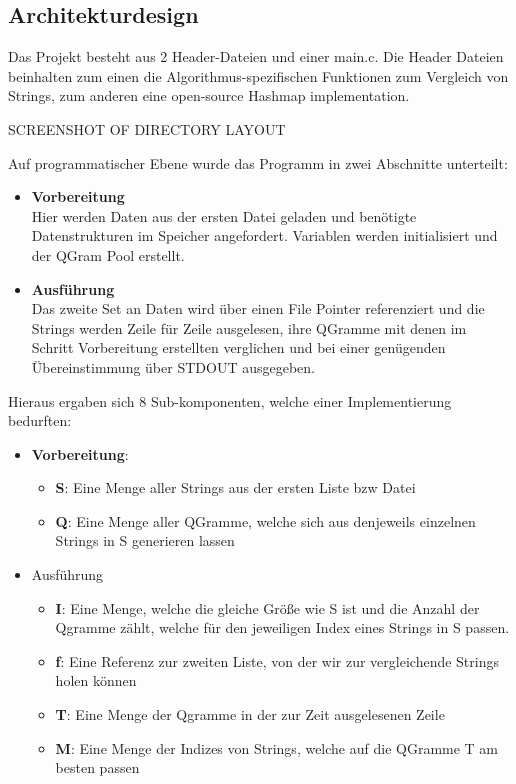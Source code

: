 \subsection{Architekturdesign}
Das Projekt besteht aus 2 Header-Dateien und einer main.c. Die Header Dateien
beinhalten zum einen die Algorithmus-spezifischen Funktionen zum Vergleich von
Strings, zum anderen eine open-source Hashmap implementation.

SCREENSHOT OF DIRECTORY LAYOUT

Auf programmatischer Ebene wurde das Programm in zwei Abschnitte unterteilt:
\begin{itemize}
    \item \textbf{Vorbereitung} \\
    Hier werden Daten aus der ersten Datei geladen und benötigte Datenstrukturen im Speicher angefordert.
    Variablen werden initialisiert und der QGram Pool erstellt.
    \item \textbf{Ausführung} \\
    Das zweite Set an Daten wird über einen File Pointer referenziert und die
    Strings werden Zeile für Zeile ausgelesen, ihre QGramme mit denen im Schritt
    Vorbereitung erstellten verglichen und bei einer genügenden Übereinstimmung
    über STDOUT ausgegeben.
\end{itemize}

Hieraus ergaben sich 8 Sub-komponenten, welche einer Implementierung bedurften:


\begin{itemize}
    \item \textbf{Vorbereitung}:
    \begin{itemize}
        \item \textbf{S}: Eine Menge aller Strings aus der ersten Liste bzw Datei
        \item \textbf{Q}: Eine Menge aller QGramme, welche sich aus denjeweils einzelnen Strings in S generieren lassen
    \end{itemize}

    \item Ausführung
    \begin{itemize}
        \item \textbf{I}: Eine Menge, welche die gleiche Größe wie S ist und die
        Anzahl der Qgramme zählt, welche für den jeweiligen Index eines Strings in
        S passen.
        \item \textbf{f}: Eine Referenz zur zweiten Liste, von der wir zur vergleichende
        Strings holen können
        \item \textbf{T}: Eine Menge der Qgramme in der zur Zeit ausgelesenen Zeile
        \item \textbf{M}: Eine Menge der Indizes von Strings, welche auf die QGramme
        T am besten passen
    \end{itemize}
\end{itemize}

